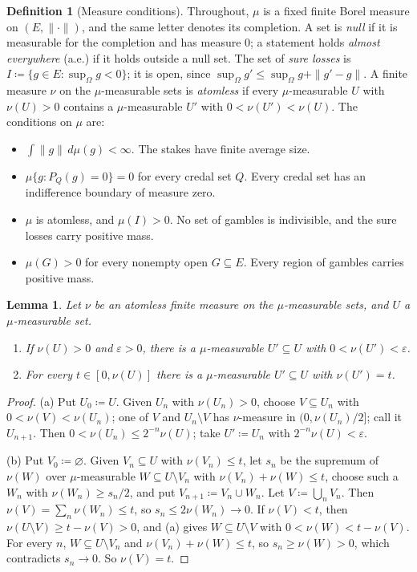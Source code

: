 \documentclass[11pt]{article}
\newtheorem{lemma}[theorem]{Lemma}
\theoremstyle{definition}
\newtheorem{definition}[theorem]{Definition}
\begin{document}
\begin{definition}[Measure conditions]\label{def:measure}
Throughout, $\mu$ is a fixed finite Borel measure on $(E,\|\cdot\|)$, and the same letter denotes its completion. A set is \emph{null} if it is measurable for the completion and has measure $0$; a statement holds \emph{almost everywhere} (a.e.) if it holds outside a null set. {\color{red}The set of \emph{sure losses} is $I\coloneqq\{g\in E:\sup_\Omega g<0\}$; it is open, since $\sup_\Omega g'\le\sup_\Omega g+\|g'-g\|$. A finite measure $\nu$ on the $\mu$-measurable sets is \emph{atomless} if every $\mu$-measurable $U$ with $\nu(U)>0$ contains a $\mu$-measurable $U'$ with $0<\nu(U')<\nu(U)$.} The conditions on $\mu$ are:
\begin{itemize}[leftmargin=3.2em]
\item[(M1)] $\int\|g\|\,d\mu(g)<\infty$. The stakes have finite average size.
\item[(M2)] $\mu\{g:P_Q(g)=0\}=0$ for every credal set $Q$. Every credal set has an indifference boundary of measure zero.
\begingroup\color{red}
\item[(M3a)] $\mu$ is atomless, and $\mu(I)>0$. No set of gambles is indivisible, and the sure losses carry positive mass.
\item[(M3b)] $\mu(G)>0$ for every nonempty open $G\subseteq E$. Every region of gambles carries positive mass.
\endgroup
\end{itemize}
\end{definition}

\begingroup\color{red}
\begin{lemma}\label{lem:atomless}
Let $\nu$ be an atomless finite measure on the $\mu$-measurable sets, and $U$ a $\mu$-measurable set.
\begin{enumerate}[label=(\alph*)]
\item If $\nu(U)>0$ and $\varepsilon>0$, there is a $\mu$-measurable $U'\subseteq U$ with $0<\nu(U')<\varepsilon$.
\item For every $t\in[0,\nu(U)]$ there is a $\mu$-measurable $U'\subseteq U$ with $\nu(U')=t$.
\end{enumerate}
\end{lemma}
\begin{proof}
(a) Put $U_0\coloneqq U$. Given $U_n$ with $\nu(U_n)>0$, choose $V\subseteq U_n$ with $0<\nu(V)<\nu(U_n)$; one of $V$ and $U_n\setminus V$ has $\nu$-measure in $(0,\nu(U_n)/2]$; call it $U_{n+1}$. Then $0<\nu(U_n)\le2^{-n}\nu(U)$; take $U'\coloneqq U_n$ with $2^{-n}\nu(U)<\varepsilon$.

(b) Put $V_0\coloneqq\varnothing$. Given $V_n\subseteq U$ with $\nu(V_n)\le t$, let $s_n$ be the supremum of $\nu(W)$ over $\mu$-measurable $W\subseteq U\setminus V_n$ with $\nu(V_n)+\nu(W)\le t$, choose such a $W_n$ with $\nu(W_n)\ge s_n/2$, and put $V_{n+1}\coloneqq V_n\cup W_n$. Let $V\coloneqq\bigcup_nV_n$. Then $\nu(V)=\sum_n\nu(W_n)\le t$, so $s_n\le2\nu(W_n)\to0$. If $\nu(V)<t$, then $\nu(U\setminus V)\ge t-\nu(V)>0$, and (a) gives $W\subseteq U\setminus V$ with $0<\nu(W)<t-\nu(V)$. For every $n$, $W\subseteq U\setminus V_n$ and $\nu(V_n)+\nu(W)\le t$, so $s_n\ge\nu(W)>0$, which contradicts $s_n\to0$. So $\nu(V)=t$.
\end{proof}
\endgroup
\end{document}
